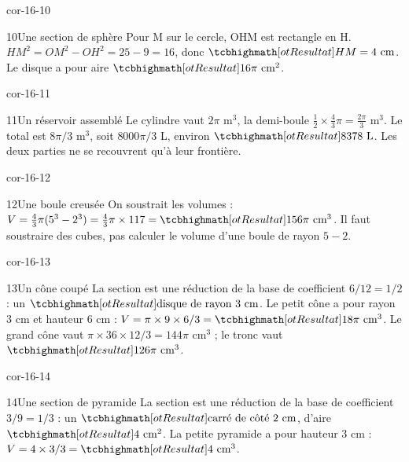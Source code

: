 \begin{blocLivre}{cor-16-10}\begin{corrige}{10}{Une section de sphère}
Pour M sur le cercle, OHM est rectangle en H. $HM^2=OM^2-OH^2=25-9=16$, donc $\res{HM=4\text{ cm}}$. Le disque a pour aire $\res{16\pi\text{ cm}^2}$.
\label{fig-cor-16-10}
\end{corrige}\end{blocLivre}
\begin{blocLivre}{cor-16-11}\begin{corrige}{11}{Un réservoir assemblé}
Le cylindre vaut $2\pi$ m$^3$, la demi-boule $\frac12\times\frac43\pi=\frac{2\pi}3$ m$^3$. Le total est $8\pi/3$ m$^3$, soit $8000\pi/3$ L, environ $\res{8378\text{ L}}$. Les deux parties ne se recouvrent qu’à leur frontière.
\label{fig-cor-16-11}
\end{corrige}\end{blocLivre}
\begin{blocLivre}{cor-16-12}\begin{corrige}{12}{Une boule creusée}
On soustrait les volumes : $V=\frac43\pi(5^3-2^3)=\frac43\pi\times117=\res{156\pi\text{ cm}^3}$. Il faut soustraire des cubes, pas calculer le volume d’une boule de rayon $5-2$.
\label{fig-cor-16-12}
\end{corrige}\end{blocLivre}
\begin{blocLivre}{cor-16-13}\begin{corrige}{13}{Un cône coupé}
La section est une réduction de la base de coefficient $6/12=1/2$ : un $\res{\text{disque de rayon 3 cm}}$. Le petit cône a pour rayon 3 cm et hauteur 6 cm : $V=\pi\times9\times6/3=\res{18\pi\text{ cm}^3}$. Le grand cône vaut $\pi\times36\times12/3=144\pi$ cm$^3$ ; le tronc vaut $\res{126\pi\text{ cm}^3}$.
\label{fig-cor-16-13}
\end{corrige}\end{blocLivre}
\begin{blocLivre}{cor-16-14}\begin{corrige}{14}{Une section de pyramide}
La section est une réduction de la base de coefficient $3/9=1/3$ : un $\res{\text{carré de côté 2 cm}}$, d’aire $\res{4\text{ cm}^2}$. La petite pyramide a pour hauteur 3 cm : $V=4\times3/3=\res{4\text{ cm}^3}$.
\label{fig-cor-16-14}
\end{corrige}\end{blocLivre}
